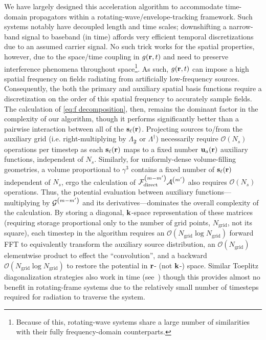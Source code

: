We have largely designed this acceleration algorithm to accommodate time-domain propagators within a rotating-wave/envelope-tracking framework.
Such systems notably have decoupled length and time scales; downshifting a narrow-band signal to baseband (in time) affords very efficient temporal discretizations due to an assumed carrier signal.
No such trick works for the spatial properties, however, due to the space/time coupling in $g(\vb{r}, t)$ and need to preserve interference phenomena throughout space\footnote{Because of this, rotating-wave systems share a large number of similarities with their fully frequency-domain counterparts.}.
As such, $g(\vb{r}, t)$ can impose a high spatial frequency on fields radiating from artificially low-frequency sources.
Consequently, the both the primary and auxiliary spatial basis functions require a discretization on the order of this spatial frequency to accurately sample fields.
The calculation of \cref{eq:f decomposition}, then, remains the dominant factor in the complexity of our algorithm, though it performs significantly better than a pairwise interaction between all of the $\vb{s}_{\ell}(\vb{r})$.
Projecting sources to/from the auxiliary grid (i.e. right-multiplying by $\Lambda_\mathfrak{F}$ or $\Lambda^\dagger$) necessarily require $\mathcal{O}(N_s)$ operations per timestep as each $\vb{s}_\ell(\vb{r})$ maps to a fixed number $\vb{u}_a(\vb{r})$ auxiliary functions, independent of $N_s$.
Similarly, for uniformly-dense volume-filling geometries, a volume proportional to $\gamma^3$ contains a fixed number of $\vb{s}_\ell(\vb{r})$ independent of $N_s$, ergo the calculation of $\mathcal{F}_\text{direct}^\qty(m-m') \mathcal{A}^\qty(m')$ also requires $\mathcal{O}(N_s)$ operations.
Thus, the potential evaluation between auxiliary functions---multiplying by $\mathcal{G}^\qty(m-m')$ and its derivatives---dominates the overall complexity of the calculation.
By storing a diagonal, $\vb{k}$-space representation of these matrices (requiring storage proportional only to the number of grid points, $N_\text{grid}$, not its square), each timestep in the algorithm requires an $\mathcal{O}(N_\text{grid} \log N_\text{grid})$ forward FFT to equivalently transform the auxiliary source distribution, an $\mathcal{O}(N_\text{grid})$ elementwise product to effect the ``convolution'', and a backward $\mathcal{O}(N_\text{grid} \log N_\text{grid})$ to restore the potential in $\vb{r}$- (not $\vb{k}$-) space.
Similar Toeplitz diagonalization strategies also work in time (see~\cite[section D]{Yilmaz2004}) though this provides almost no benefit in rotating-frame systems due to the relatively small number of timesteps required for radiation to traverse the system.

